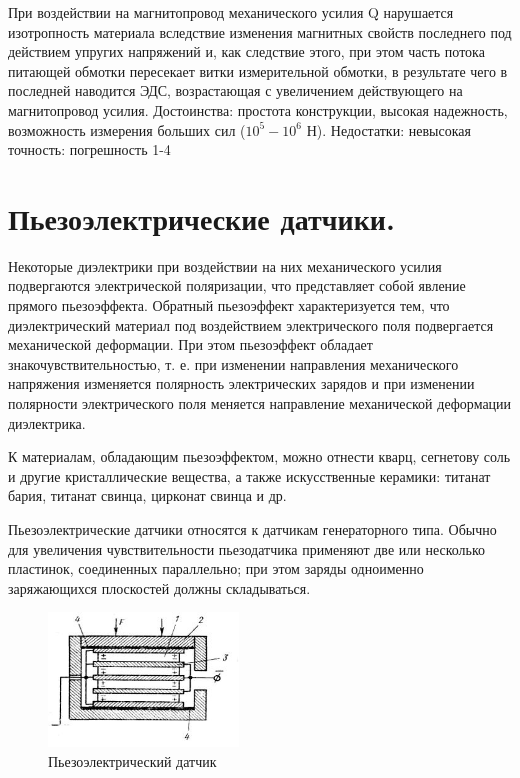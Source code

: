 \documentclass[unicode, 12pt, a4paper, oneside]{article}
\begin{document}
При воздействии на магнитопровод механического усилия Q нарушается изотропность материала вследствие изменения магнитных свойств последнего под действием упругих напряжений и, как следствие этого, при этом часть потока питающей обмотки пересекает витки измерительной обмотки, в результате чего в последней наводится ЭДС, возрастающая с увеличением действующего на магнитопровод усилия.
Достоинства: простота конструкции, высокая надежность, возможность измерения больших сил ($10^5 - 10^6$ Н). Недостатки: невысокая точность: погрешность 1-4 %

\section{Пьезоэлектрические датчики.}

Некоторые диэлектрики при воздействии на них механического усилия подвергаются электрической поляризации, что представляет собой явление прямого пьезоэффекта. Обратный пьезоэффект характеризуется тем, что диэлектрический материал под воздействием электрического поля подвергается механической деформации. При этом пьезоэффект обладает знакочувствительностью, т. е. при изменении направления механического напряжения изменяется полярность электрических зарядов и при изменении полярности электрического поля меняется направление механической деформации диэлектрика.

К материалам, обладающим пьезоэффектом, можно отнести кварц, сегнетову соль и другие кристаллические вещества, а также искусственные керамики: титанат бария, титанат свинца, цирконат свинца и др.

Пьезоэлектрические датчики относятся к датчикам генераторного типа. Обычно для увеличения чувствительности пьезодатчика применяют две или несколько пластинок, соединенных параллельно; при этом заряды одноименно заряжающихся плоскостей должны складываться.

\begin{figure}[H]
\centering
\includegraphics[width=0.45\textwidth]{59.jpg}
\caption{Пьезоэлектрический датчик}
\end{figure}
\end{document}
